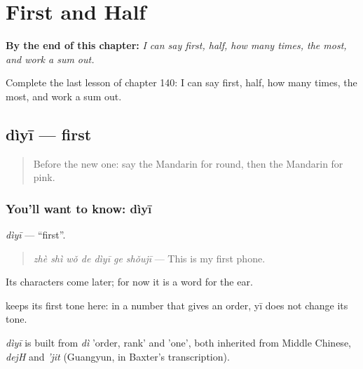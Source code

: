 
\chapter{First and Half}
\label{ch:zh-first-and-half}

\begin{chapteropening}
\textbf{By the end of this chapter:} \emph{I can say first, half, how many times, the most, and work a sum out.}

Complete the last lesson of chapter 140: I can say first, half, how many times, the most, and work a sum out.
\end{chapteropening}

\section[dìyī]{dìyī — first}

\label{lesson:ZH-C140-diyi}



\begin{quote}
Before the new one: say the Mandarin for round, then the Mandarin for pink.
\end{quote}

\subsection*{You'll want to know: dìyī}
\emph{dìyī} — \textquotedblleft{}first\textquotedblright{}.

\begin{quote}
\emph{zhè shì wǒ de dìyī ge shǒujī} — This is my first phone.
\end{quote}

Its characters come later; for now it is a word for the ear.

 keeps its first tone here: in a number that gives an order, yī does not change its tone.

\begin{cousinweb}
\emph{dìyī} is built from \emph{dì} 'order, rank' and  'one', both inherited from Middle Chinese, \emph{dejH} and \emph{'jit} (Guangyun, in Baxter's transcription).
\end{cousinweb}

